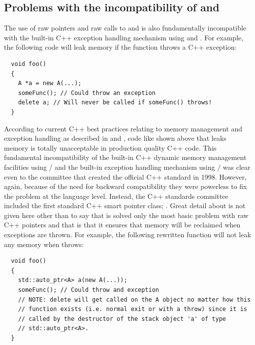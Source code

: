 \documentclass[pdf,ps2pdf,11pt]{SANDreport}
\begin{document}
%
{}\subsection{Problems with the incompatibility of
{} and {}}
%

The use of raw pointers and raw calls to {} and
{} is also fundamentally incompatible with the built-in
C++ exception handling mechanism using {} and
{}.  For example, the following code will leak memory
if the function {} throws a C++ exception:

{\small\begin{verbatim}
  void foo()
  {
    A *a = new A(...);
    someFunc(); // Could throw an exception
    delete a; // Will never be called if someFunc() throws!
  }
\end{verbatim}}

According to current C++ best practices relating to memory management
and exception handling as described in {}\cite[Item
{}\#29]{EffectiveC++ThirdEdition} and {}\cite[Item
{}\#71]{C++CodingStandards05}, code like shown above that leaks memory
is totally unacceptable in production quality C++ code.  This
fundamental incompatibility of the built-in C++ dynamic memory
management facilities using {}/ and the built-in
exception handling mechanism using {}/ was clear
even to the committee that created the official C++ standard in 1998.
However, again, because of the need for backward compatibility they
were powerless to fix the problem at the language level.  Instead, the
C++ standards committee included the first standard C++ smart pointer
class; {}.  Great detail about {} is not
given here other than to say that is solved only the most basic
problem with raw C++ pointers and that is that it ensures that memory
will be reclaimed when exceptions are thrown.  For example, the
following rewritten function will not leak any memory when
{} throws:

{\small\begin{verbatim}
  void foo()
  {
    std::auto_ptr<A> a(new A(...));
    someFunc(); // Could throw and exception
    // NOTE: delete will get called on the A object no matter how this
    // function exists (i.e. normal exit or with a throw) since it is
    // called by the destructor of the stack object 'a' of type
    // std::auto_ptr<A>. 
  }
\end{verbatim}}
\end{document}
